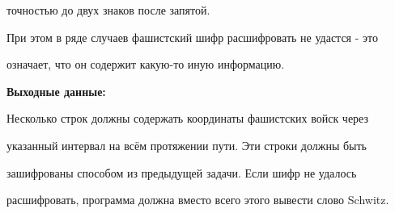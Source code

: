 \begin{question}
точностью до двух знаков после запятой.



При этом в ряде случаев фашистский шифр расшифровать не удастся - это

означает, что он содержит какую-то иную информацию.



\textbf{Выходные данные:}



Несколько строк должны содержать координаты фашистских войск через

указанный интервал на всём протяжении пути. Эти строки должны быть

зашифрованы способом из предыдущей задачи. Если шифр не удалось

расшифровать, программа должна вместо всего этого вывести слово Schwitz.


\end{question}
